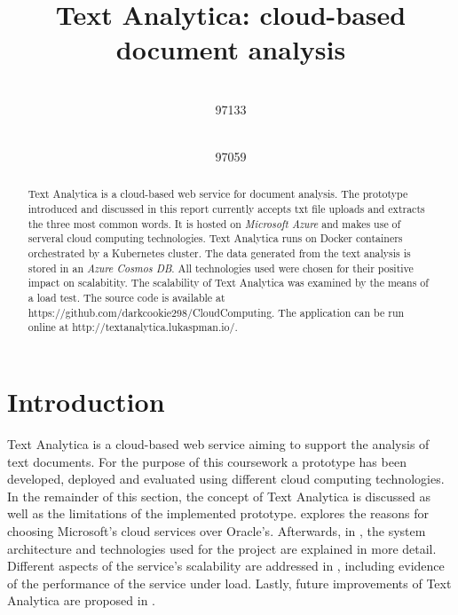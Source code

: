 \documentclass[conference]{IEEEtran}
\begin{document}
\title{Text Analytica: cloud-based document analysis\\}

\author{
 \\
97133
\and
{}
\\
97059
}

\maketitle

\begin{abstract}
Text Analytica is a cloud-based web service for document analysis. The prototype introduced and discussed in this report currently accepts txt file uploads and extracts the three most common words. It is hosted on \textit{Microsoft Azure} and makes use of serveral cloud computing technologies. Text Analytica runs on Docker containers orchestrated by a Kubernetes cluster. The data generated from the text analysis is stored in an \textit{Azure Cosmos DB}. All technologies used were chosen for their positive impact on scalabitity. The scalability of Text Analytica was examined by the means of a load test. The source code is available at https://github.com/darkcookie298/CloudComputing. The application can be run online at http://textanalytica.lukaspman.io/.
\end{abstract}

\section{Introduction}
\label{sec:intro}
Text Analytica is a cloud-based web service aiming to support the analysis of text documents. For the purpose of this coursework a prototype has been developed, deployed and evaluated using different cloud computing technologies. In the remainder of this section, the concept of Text Analytica is discussed as well as the limitations of the implemented prototype.  explores the reasons for choosing Microsoft's cloud services over Oracle's. Afterwards, in , the system architecture and technologies used for the project are explained in more detail. Different aspects of the service's scalability are addressed in , including evidence of the performance of the service under load. Lastly, future improvements of Text Analytica are proposed in .
\end{document}
